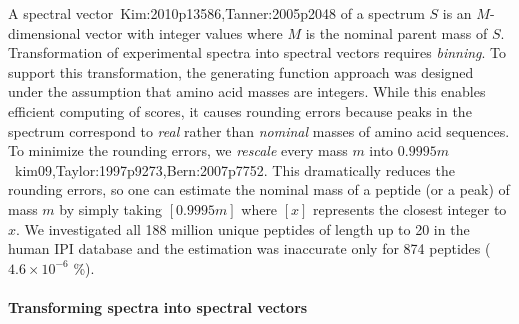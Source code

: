 A spectral vector~\cite{unv}{Kim:2010p13586,Tanner:2005p2048} of a spectrum $S$ is an $M$-dimensional vector with integer values where $M$ is the nominal parent mass of $S$. 
Transformation of experimental spectra into spectral vectors requires {\em binning}.
To support this transformation, the generating function approach was designed under the assumption that amino acid masses are integers.
While this enables efficient computing of scores, 
it causes rounding errors because peaks in the spectrum correspond to {\em real} rather than {\em nominal} masses of amino acid sequences.
To minimize the rounding errors, we {\em rescale} every mass $m$ into $0.9995m$~\cite{unv}{kim09,Taylor:1997p9273,Bern:2007p7752}.
This dramatically reduces the rounding errors,
so one can estimate the nominal mass of a peptide (or a peak) of mass $m$ by simply taking $[0.9995m]$ where $[x]$ represents the closest integer to $x$.
We investigated all 188 million unique peptides of length up to 20 in the human IPI database 
and the estimation was inaccurate only for 874 peptides ($4.6 \times 10^{-6}$ \%).




\paragraph{Transforming spectra into spectral vectors}
\label{PRMGen}


